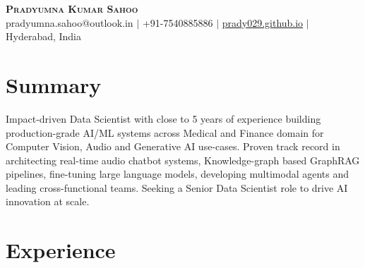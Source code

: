 \documentclass[letterpaper,11pt]{article}
\begin{document}
\begin{center}
    \textbf{\Huge \scshape Pradyumna Kumar Sahoo} \\ \vspace{1pt}
    {pradyumna.sahoo@outlook.in} $|$
    \small {+91-7540885886} $|$
    \href{https://prady029.github.io}{prady029.github.io} $|$
    \small {Hyderabad, India}
\end{center}

\section{Summary}
\noindent\begin{minipage}{\linewidth}
Impact-driven Data Scientist with close to 5 years of experience building production-grade AI/ML systems across Medical and Finance domain for Computer Vision, Audio and Generative AI use-cases. Proven track record in architecting real-time audio chatbot systems, Knowledge-graph based GraphRAG pipelines, fine-tuning large language models, developing multimodal agents and leading cross-functional teams. Seeking a Senior Data Scientist role to drive AI innovation at scale.
\end{minipage}

\section{Experience}
\end{document}
